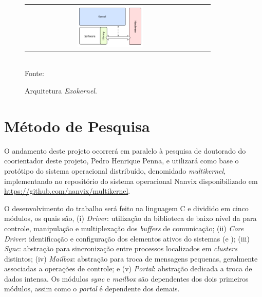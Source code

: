 \documentclass[
	12pt,				%
	openright,			%
	twoside,			%
	a4paper,			%
	english,			%
	brazil,				%
	]{abntex2}
\begin{document}
        \begin{figure}[t]
        	\begin{center}
            	\caption{Arquitetura \textit{Exokernel}.}
                   \label{figexokernel}
        		\begin{tabular}{ccc}
            	    \includegraphics[width=0.4\textwidth]{figs/exokernel.png} \\
        		\end{tabular}
                \vspace{1ex} \\
                Fonte: \cite{misc:exokernel}
            \end{center}
           \vspace{-2ex}
        \end{figure}

\chapter{Método de Pesquisa}
\label{cap:metodo-pesquisa}

    O andamento deste projeto ocorrerá em paralelo à pesquisa de doutorado do
    coorientador deste projeto, Pedro Henrique Penna, e utilizará como base o
    protótipo do sistema operacional distribuído, denomidado \textit{multikernel},
    implementando no repositório do sistema operacional Nanvix \cite{Penna2017,Penna2017-1}
    disponibilizado em \url{https://github.com/nanvix/multikernel}.
    
    O desenvolvimento do trabalho será feito na linguagem C e dividido em
    cinco módulos, os quais são,
    (i) \textit{\noc Driver}: utilização da biblioteca de baixo nível da \noc
    para controle, manipulação e multiplexação dos \textit{buffers} de comunicação;
    (ii) \textit{Core Driver}: identificação e configuração dos elementos ativos 
    do sistemas (\ioclusters e \cpclusters); 
    (iii) \textit{Sync}: abstração para sincronização entre processos localizados
    em \textit{clusters} distintos;
    (iv) \textit{Mailbox}: abstração para troca de mensagens pequenas, geralmente 
    associadas a operações de controle; e 
    (v) \textit{Portal}: abstração dedicada a troca de dados intensa. 
    Os módulos \textit{sync} e \textit{mailbox} são dependentes dos dois
    primeiros módulos, assim como o \textit{portal} é dependente dos demais.
    
\end{document}
